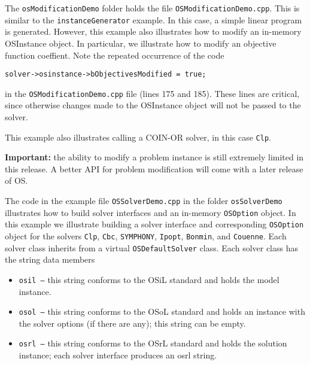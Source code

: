 

\label{section:exampleOSModDemo}

The {\tt osModificationDemo} folder holds the file {\tt OSModificationDemo.cpp}.
This is similar to the {\tt instanceGenerator} example. In this case, a simple
linear program is generated. However, this example also illustrates how to
modify an in-memory OSInstance object. In particular, we illustrate how to
modify an objective function coeffient. Note the repeated occurrence of the code

\begin{verbatim}
solver->osinstance->bObjectivesModified = true;
\end{verbatim}

\noindent in the {\tt OSModificationDemo.cpp} file (lines 175 and 185).
These lines are critical, since otherwise changes made to the OSInstance object
will not be passed to the solver.

This example also illustrates calling a COIN-OR solver,
in this case {\tt Clp}.

\vskip 8pt

{\bf Important:} the ability to modify a problem instance is still extremely limited in this release.
A better API for problem modification will come with a later release of OS.



\label{section:exampleOSSolverDemo}

The code in the  example file {\tt OSSolverDemo.cpp} in the folder {\tt osSolverDemo}  illustrates  how to build solver interfaces and  an in-memory {\tt OSOption} object. In this example we  illustrate building a solver interface and corresponding {\tt OSOption} object for the solvers {\tt Clp}, {\tt Cbc}, {\tt SYMPHONY}, {\tt Ipopt},   {\tt Bonmin}, and {\tt Couenne}.   Each solver class inherits from a virtual {\tt OSDefaultSolver} class. Each solver class has the string data members

\begin{itemize}
\item {\tt osil --} this string conforms to the OSiL standard and holds the model instance.

\item {\tt osol --} this string conforms to the OSoL standard and holds an instance with the 
solver options (if there are any); this string can be empty.

\item {\tt osrl --} this string conforms to the OSrL standard and holds the solution instance; 
each solver interface produces an osrl string.
\end{itemize}

